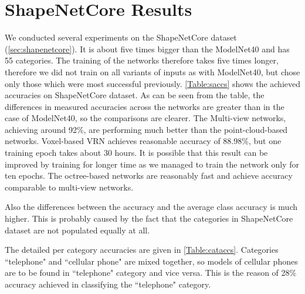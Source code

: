 \section{ShapeNetCore Results}
We conducted several experiments on the ShapeNetCore dataset (\autoref{sec:shapenetcore}). It is about five times bigger than the ModelNet40 and has 55 categories. The training of the networks therefore takes five times longer, therefore we did not train on all variants of inputs as with ModelNet40, but chose only those which were most successful previously. \autoref{Table:saccs} shows the achieved accuracies on ShapeNetCore dataset.
As can be seen from the table, the differences in measured accuracies across the networks are greater than in the case of ModelNet40, so the comparisons are clearer. The Multi-view networks, achieving around 92\%, are performing much better than the point-cloud-based networks. Voxel-based VRN achieves reasonable accuracy of 88.98\%, but one training epoch takes about 30 hours. It is possible that this result can be improved by training for longer time as we managed to train the network only for ten epochs. The octree-based networks are reasonably fast and achieve accuracy comparable to multi-view networks.  \par
Also the differences between the accuracy and the average class accuracy is much higher. This is probably caused by the fact that the categories in ShapeNetCore dataset are not populated equally at all.\par



The detailed per category accuracies are given in \autoref{Table:cataccs}. Categories ``telephone" and ``cellular phone" are mixed together, so models of cellular phones are to be found in ``telephone" category and vice versa. This is the reason of 28\% accuracy achieved in classifying the ``telephone" category.



